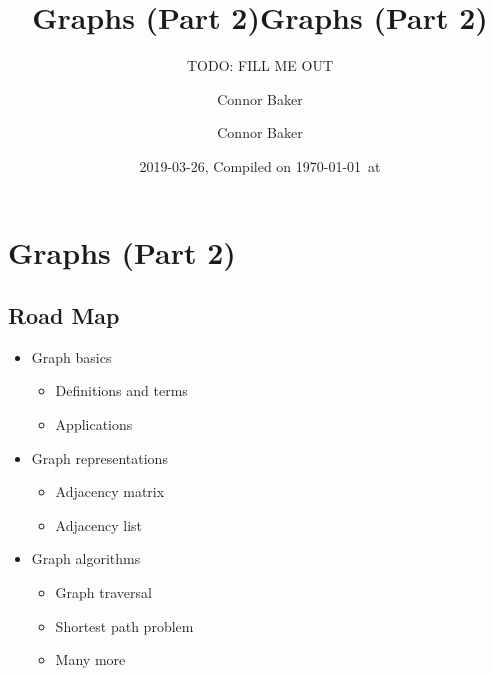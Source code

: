 \documentclass[
  10pt,
  english,
  letterpaper,
,tablecaptionabove
]{scrartcl}
\title{Graphs (Part 2)}
\subtitle{TODO: FILL ME OUT}
\author{Connor Baker}
\date{2019-03-26, Compiled on \today~at \currenttime}
\title{Graphs (Part 2)}
\author{Connor Baker}
\providecommand{\tightlist}{%
  \setlength{\itemsep}{0pt}\setlength{\parskip}{0pt}}
\begin{document}

\begin{titlepage}
\afterpage{\restorepagecolor}
\newcommand{\colorRule}[3][black]{\textcolor[HTML]{#1}{\rule{#2}{#3}}}
\end{titlepage}
\restoregeometry




\hypertarget{graphs-part-2}{%
\section{Graphs (Part 2)}\label{graphs-part-2}}

\hypertarget{road-map}{%
\subsection{Road Map}\label{road-map}}

\begin{itemize}
\tightlist
\item
  Graph basics

  \begin{itemize}
  \tightlist
  \item
    Definitions and terms
  \item
    Applications
  \end{itemize}
\item
  Graph representations

  \begin{itemize}
  \tightlist
  \item
    Adjacency matrix
  \item
    Adjacency list
  \end{itemize}
\item
  Graph algorithms

  \begin{itemize}
  \tightlist
  \item
    Graph traversal
  \item
    Shortest path problem
  \item
    Many more
  \end{itemize}
\end{itemize}
\end{document}
